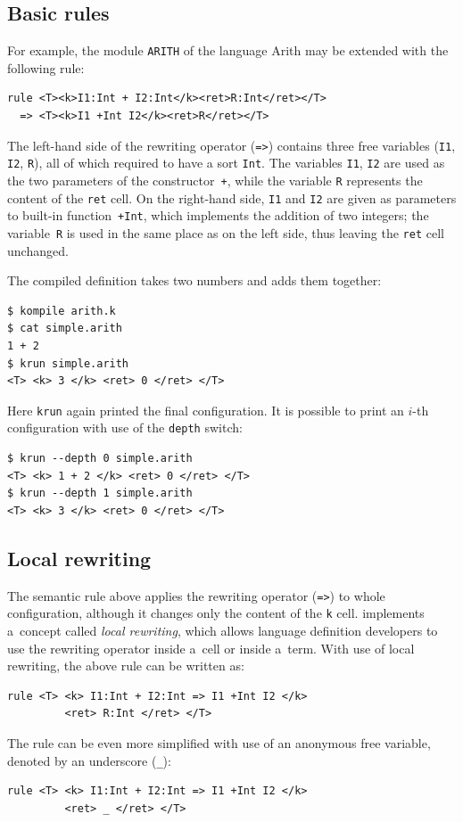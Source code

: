 \documentclass[nolot,nolof,nocover,printed]{fithesis3}
\newcommand{\krun}{\texttt{krun}\xspace}
\begin{document}
\subsection{Basic rules}
For example, the module \texttt{ARITH} of the language Arith may be extended with the following rule:
\begin{lstlisting}
rule <T><k>I1:Int + I2:Int</k><ret>R:Int</ret></T> 
  => <T><k>I1 +Int I2</k><ret>R</ret></T>
\end{lstlisting}
The left-hand side of the rewriting operator (\lstinline|=>|) contains three free variables (\texttt{I1}, \texttt{I2}, \texttt{R}), all of which required to have a sort \texttt{Int}. The variables \texttt{I1}, \texttt{I2} are used as the two parameters of the constructor~\lstinline|+|, while the variable \texttt{R} represents the content of the \texttt{ret} cell. On the right-hand side, \texttt{I1} and \texttt{I2} are given as parameters to built-in function~\lstinline|+Int|, which implements the addition of two integers; the variable~\texttt{R} is used in the same place as on the left side, thus leaving the \texttt{ret} cell unchanged.

The compiled definition takes two numbers and adds them together:
\begin{lstlisting}
$ kompile arith.k
$ cat simple.arith
1 + 2
$ krun simple.arith
<T> <k> 3 </k> <ret> 0 </ret> </T>
\end{lstlisting}
Here \krun again printed the final configuration. It is possible to print an $i$-th configuration with use of the \texttt{depth} switch:
\begin{lstlisting}
$ krun --depth 0 simple.arith
<T> <k> 1 + 2 </k> <ret> 0 </ret> </T>
$ krun --depth 1 simple.arith
<T> <k> 3 </k> <ret> 0 </ret> </T>
\end{lstlisting}

\subsection{Local rewriting}
The semantic rule above applies the rewriting operator (\lstinline|=>|) to whole configuration, although it changes only the content of the \texttt{k} cell. \K implements a~concept called \textit{local rewriting}, which allows language definition developers to use the rewriting operator inside a~cell or inside a~term. With use of local rewriting, the above rule can be written as:
\begin{lstlisting}
rule <T> <k> I1:Int + I2:Int => I1 +Int I2 </k>
         <ret> R:Int </ret> </T>
\end{lstlisting}
The rule can be even more simplified with use of an anonymous free variable, denoted by an underscore (\lstinline|_|):
\begin{lstlisting}
rule <T> <k> I1:Int + I2:Int => I1 +Int I2 </k>
         <ret> _ </ret> </T>
\end{lstlisting}
\end{document}
